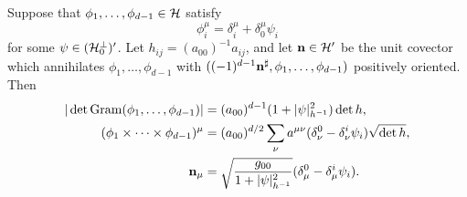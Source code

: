 \begin{lemma} \label{cross product formula}
Suppose that $\phi_1, \dots, \phi_{d - 1} \in \mathcal H$ satisfy
\begin{equation}\label{cross product formula hypothesis}
\phi_i^\mu = \delta_i^\mu + \delta_0^\mu \psi_i
\end{equation}
for some $\psi \in (\mathcal H_0^\perp)'$.
Let $h_{ij} = (a_{00})^{-1} a_{ij}$, and let $\mathbf n \in \mathcal H'$ be the unit covector which annihilates $\phi_1, \dots, \phi_{d - 1}$ with $((-1)^{d - 1}\mathbf n^\sharp, \phi_1, \dots, \phi_{d - 1})$ positively oriented.
Then
\begin{align}
|\det \operatorname{Gram}(\phi_1, \dots, \phi_{d - 1})| &= (a_{00})^{d - 1} (1 + |\psi|_{h^{-1}}^2) \det h, \label{WeinsteinAronszajn} \\
(\phi_1 \times \cdots \times \phi_{d - 1})^\mu &= (a_{00})^{d/2} \sum_\nu a^{\mu \nu}(\delta_\nu^0 - \delta^i_\nu \psi_i) \sqrt{\det h}, \label{CrossProduct} \\
\mathbf n_\mu &= \sqrt{\frac{g_{00}}{1 + |\psi|_{h^{-1}}^2}} (\delta^0_\mu - \delta^i_\mu \psi_i) \label{conormal crossproduct}.
\end{align}
\end{lemma}
